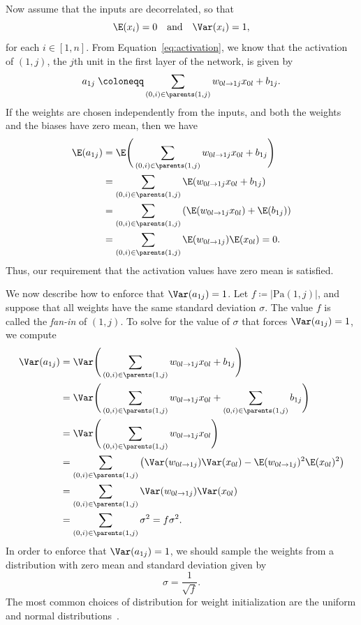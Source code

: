 \documentclass[11pt,a4paper]{article}
\numberwithin{equation}{section}
\newcommand{\weight}[2]{w_{#1 \rightarrow #2}}
\begin{document}
Now assume that the inputs are decorrelated, so that
\[
	\E(x_i) = 0 \quad\text{and}\quad \Var(x_i) = 1,
\]
for each $i \in [1, n]$. From Equation~\ref{eq:activation}, we know that the
activation of $(1, j)$, the $j$th unit in the first layer of the network, is
given by
\[
	a_{1j} \;\coloneqq \sum_{(0, i) \in \parents(1, j)} \weight{0l}{1j} x_{0l} + b_{1j}.
\]
If the weights are chosen independently from the inputs, and both the weights
and the biases have zero mean, then we have
\begin{align*}
	\E(a_{1j})
	&= \E\Bigg(\sum_{(0, i) \in \parents(1, j)} \weight{0l}{1j} x_{0l} + b_{1j}\Bigg) \\
	&= \sum_{(0, i) \in \parents(1, j)} \E(\weight{0l}{1j} x_{0l} + b_{1j}) \\
	&= \sum_{(0, i) \in \parents(1, j)} \left(\E(\weight{0l}{1j} x_{0l}) + \E(b_{1j})\right) \\
	&= \sum_{(0, i) \in \parents(1, j)} \E(\weight{0l}{1j}) \E(x_{0l}) = 0.
\end{align*}
Thus, our requirement that the activation values have zero mean is satisfied.

We now describe how to enforce that $\Var(a_{1j}) = 1$. Let $f \coloneqq
|\text{Pa}(1, j)|$, and suppose that all weights have the same standard
deviation $\sigma$. The value $f$ is called the \emph{fan-in} of $(1, j)$. To
solve for the value of $\sigma$ that forces $\Var(a_{1j}) = 1$, we compute
\begin{align*}
	\Var(a_{1j})
	&= \Var\Bigg(\sum_{(0, i) \in \parents(1, j)} \weight{0l}{1j} x_{0l} + b_{1j}\Bigg) \\
	&= \Var\Bigg(
		\sum_{(0, i) \in \parents(1, j)} \weight{0l}{1j} x_{0l} +
		\sum_{(0, i) \in \parents(1, j)} b_{1j}
	\Bigg) \\
	&= \Var\Bigg(\sum_{(0, i) \in \parents(1, j)} \weight{0l}{1j} x_{0l}\Bigg)\\
	&= \sum_{(0, i) \in \parents(1, j)} \left(
		\Var(\weight{0l}{1j}) \Var(x_{0l}) -
		\E(\weight{0l}{1j})^2 \E(x_{0l})^2
	\right) \\
	&= \sum_{(0, i) \in \parents(1, j)} \Var(\weight{0l}{1j}) \Var(x_{0l}) \\
	&= \sum_{(0, i) \in \parents(1, j)} \sigma^2 = f \sigma^2.
\end{align*}
In order to enforce that $\Var(a_{1j}) = 1$, we should sample the weights from a
distribution with zero mean and standard deviation given by
\[
	\sigma = \frac{1}{\sqrt{f}}.
\]
The most common choices of distribution for weight initialization are the
uniform and normal distributions~\citep{lecun-98b, krizhevsky2012imagenet}.
\end{document}
